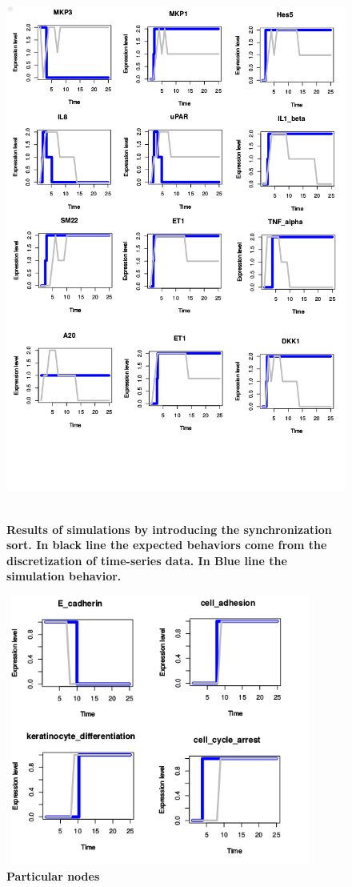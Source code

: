 \begin{figure}[!ht]
\centering
\includegraphics[width=5in,height=7in]{images/12genes_sim.png}
\caption{\bf Results of simulations by introducing the synchronization sort. In black line the expected behaviors
come from the discretization of time-series data. In Blue line the simulation behavior.}
\label{fig:rws}
\end{figure}



\begin{figure}[!ht]
\centering
\includegraphics[width=4in,height=3.5in]{images/key_nodes1.png}
\caption{\bf Particular nodes}
\label{fig:knodes}
\end{figure}



